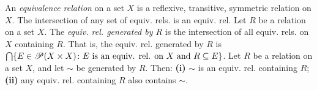  An \textit{equivalence relation} on a set $X$ is a reflexive, transitive, symmetric relation on $X$.
 The intersection of any set of equiv. rels. is an equiv. rel.
 Let $R$ be a relation on a set $X$. The \textit{equiv. rel. generated by $R$} is the intersection of all equiv. rels. on $X$ containing $R$. That is, the equiv. rel. generated by $R$ is $\bigcap\{ E \in \operatorname{\mathscr{P}}(X \times X) \colon E \text{ is an equiv. rel. on } X \text{ and } R \subseteq E \}$.
 Let $R$ be a relation on a set $X$, and let $\sim$ be generated by $R$. Then: \textbf{(i)} $\sim$ is an equiv. rel. containing $R$; \textbf{(ii)} any equiv. rel. containing $R$ also contains $\sim$.
